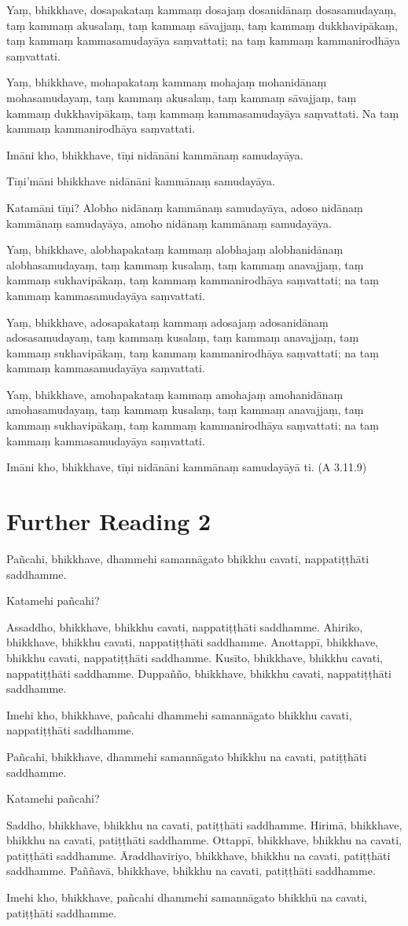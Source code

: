 Yaṃ, bhikkhave, dosapakataṃ kammaṃ dosajaṃ dosanidānaṃ dosasamudayaṃ, taṃ kammaṃ akusalaṃ, taṃ kammaṃ sāvajjaṃ, taṃ kammaṃ dukkhavipākaṃ, taṃ kammaṃ kammasamudayāya saṃvattati; na taṃ kammaṃ kammanirodhāya saṃvattati.

Yaṃ, bhikkhave, mohapakataṃ kammaṃ mohajaṃ mohanidānaṃ mohasamudayaṃ, taṃ kammaṃ akusalaṃ, taṃ kammaṃ sāvajjaṃ, taṃ kammaṃ dukkhavipākaṃ, taṃ kammaṃ kammasamudayāya saṃvattati. Na taṃ kammaṃ kammanirodhāya saṃvattati.

Imāni kho, bhikkhave, tīṇi nidānāni kammānaṃ samudayāya.

Tīṇi’māni bhikkhave nidānāni kammānaṃ samudayāya.

Katamāni tīṇi? Alobho nidānaṃ kammānaṃ samudayāya, adoso nidānaṃ kammānaṃ samudayāya, amoho nidānaṃ kammānaṃ samudayāya.

Yaṃ, bhikkhave, alobhapakataṃ kammaṃ alobhajaṃ alobhanidānaṃ alobhasamudayaṃ, taṃ kammaṃ kusalaṃ, taṃ kammaṃ anavajjaṃ, taṃ kammaṃ sukhavipākaṃ, taṃ kammaṃ kammanirodhāya saṃvattati; na taṃ kammaṃ kammasamudayāya saṃvattati.

Yaṃ, bhikkhave, adosapakataṃ kammaṃ adosajaṃ adosanidānaṃ adosasamudayaṃ, taṃ kammaṃ kusalaṃ, taṃ kammaṃ anavajjaṃ, taṃ kammaṃ sukhavipākaṃ, taṃ kammaṃ kammanirodhāya saṃvattati; na taṃ kammaṃ kammasamudayāya saṃvattati.

Yaṃ, bhikkhave, amohapakataṃ kammaṃ amohajaṃ amohanidānaṃ amohasamudayaṃ, taṃ kammaṃ kusalaṃ, taṃ kammaṃ anavajjaṃ, taṃ kammaṃ sukhavipākaṃ, taṃ kammaṃ kammanirodhāya saṃvattati; na taṃ kammaṃ kammasamudayāya saṃvattati.

Imāni kho, bhikkhave, tīṇi nidānāni kammānaṃ samudayāyā ti. (A 3.11.9)

\section*{Further Reading 2}

Pañcahi, bhikkhave, dhammehi samannāgato bhikkhu cavati, nappatiṭṭhāti saddhamme.

Katamehi pañcahi?

Assaddho, bhikkhave, bhikkhu cavati, nappatiṭṭhāti saddhamme. Ahiriko, bhikkhave, bhikkhu cavati, nappatiṭṭhāti saddhamme. Anottappī, bhikkhave, bhikkhu cavati, nappatiṭṭhāti saddhamme. Kusīto, bhikkhave, bhikkhu cavati, nappatiṭṭhāti saddhamme. Duppañño, bhikkhave, bhikkhu cavati, nappatiṭṭhāti saddhamme.

Imehi kho, bhikkhave, pañcahi dhammehi samannāgato bhikkhu cavati, nappatiṭṭhāti saddhamme.

Pañcahi, bhikkhave, dhammehi samannāgato bhikkhu na cavati, patiṭṭhāti saddhamme.

Katamehi pañcahi?

Saddho, bhikkhave, bhikkhu na cavati, patiṭṭhāti saddhamme. Hirimā, bhikkhave, bhikkhu na cavati, patiṭṭhāti saddhamme. Ottappī, bhikkhave, bhikkhu na cavati, patiṭṭhāti saddhamme. Āraddhaviriyo, bhikkhave, bhikkhu na cavati, patiṭṭhāti saddhamme. Paññavā, bhikkhave, bhikkhu na cavati, patiṭṭhāti saddhamme.

Imehi kho, bhikkhave, pañcahi dhammehi samannāgato bhikkhū na cavati, patiṭṭhāti saddhamme.